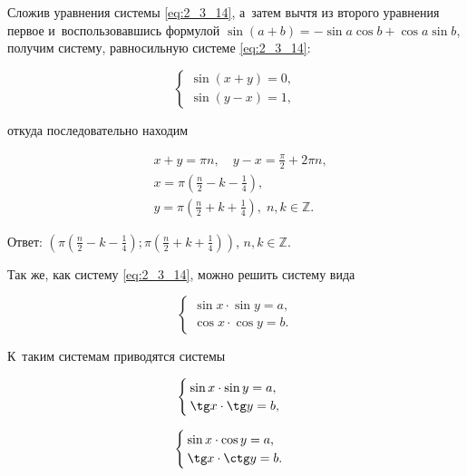 Сложив уравнения системы \eqref{eq:2_3_14}, а~затем вычтя из второго уравнения
первое и~воспользовавшись формулой $\sin (a + b) = -\sin a \cos b + \cos a \sin b$,
получим систему, равносильную системе \eqref{eq:2_3_14}:

\begin{equation*} 
\begin{cases}
\sin (x + y) = 0, \\
\sin (y - x) = 1,
\end{cases}
\end{equation*} 

\noindent
откуда последовательно находим

\begin{align*}
& \displaystyle x + y = \pi n, \quad y - x = \frac{\pi}{2} + 2\pi n, \\
& \displaystyle x = \pi \left ( \frac{n}{2} - k - \frac{1}{4} \right ), \\
& \displaystyle y = \pi \left ( \frac{n}{2} + k + \frac{1}{4} \right ), \;
n, k \in \mathbb{Z}.
\end{align*}

Ответ:
$\displaystyle
\left(
\pi \left(\frac{n}{2} - k - \frac{1}{4}\right);
\pi \left(\frac{n}{2} + k + \frac{1}{4}\right)
\right)$, $n, k \in \mathbb{Z}$.

Так же, как систему \eqref{eq:2_3_14}, можно решить систему вида

\begin{equation*}
\begin{cases}
\sin x \cdot \sin y = a, \\
\cos x \cdot \cos y = b.
\end{cases}
\end{equation*}

К~таким системам приводятся системы 

\begin{equation*}
\begin{cases}
\sin x \cdot \sin y = a, \\
\tg x \cdot \tg y = b, \\
\end{cases}
\end{equation*}

\begin{equation*}
\begin{cases}
\sin x \cdot \cos y = a, \\
\tg x \cdot \ctg y = b.
\end{cases}
\end{equation*}

